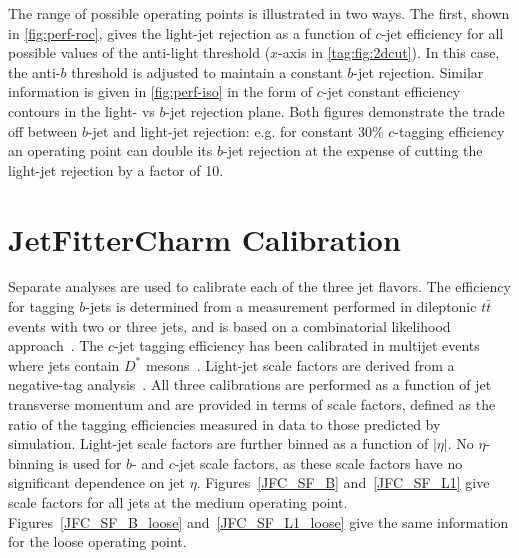 The range of possible operating points is illustrated in two ways. The first, shown in \cref{fig:perf-roc}, gives the light-jet rejection as a function of $c$-jet efficiency for all possible values of the anti-light threshold ($x$-axis in \cref{tag:fig:2dcut}). In this case, the anti-$b$ threshold is adjusted to maintain a constant $b$-jet rejection. Similar information is given in \cref{fig:perf-iso} in the form of $c$-jet constant efficiency contours in the light- vs $b$-jet rejection plane. Both figures demonstrate the trade off between $b$-jet and light-jet rejection: e.g. for constant 30\% $c$-tagging efficiency an operating point can double its $b$-jet rejection at the expense of cutting the light-jet rejection by a factor of 10.



\section{JetFitterCharm Calibration}
\label{sec:calib}
Separate analyses are used to calibrate each of the three jet flavors.
The efficiency for tagging $b$-jets is determined from a measurement performed in dileptonic $t\bar{t}$ events with two or three jets, and is based on a combinatorial likelihood approach~\cite{Giacinto}.
The $c$-jet tagging efficiency has been calibrated in multijet events where jets contain $D^*$ mesons~\cite{bc2014}.
Light-jet scale factors are derived from a negative-tag analysis~\cite{bc2014}.
All three calibrations are performed as a function of jet transverse momentum and are provided in terms of scale factors, defined as the ratio of the tagging efficiencies measured in data to those predicted by simulation.
Light-jet scale factors are further binned as a function of $|\eta|$. No $\eta$-binning is used for $b$- and $c$-jet scale factors, as these scale factors have no significant dependence on jet $\eta$.
Figures~\ref{JFC_SF_B} and~\ref{JFC_SF_L1} give scale factors for all jets at the medium operating point. Figures~\ref{JFC_SF_B_loose} and~\ref{JFC_SF_L1_loose} give the same information for the loose operating point.

\newcommand{\lSF}{as described in~\cite{bc2014}. The scale factors are measured relative to dijet \textsc{pythia8 + EvtGen}} %
\newcommand{\cSF}{as described in~\cite{bc2014}. The scale factors are measured relative to dijet \textsc{pythia8}} %
\newcommand{\bSF}{as described in~\cite{Giacinto}. The scale factors are measured relative to $t \bar{t}$ \textsc{powheg + pythia6}} %
\newcommand{\bcSF}{The derivation of the $b$-tagging ($c$-tagging) scale factors, shown here relative to $t \bar{t}$ \textsc{powheg + pythia6} (dijet \textsc{pythia8}), is described in~\cite{Giacinto} (\hspace{1sp}\cite{bc2014})}


